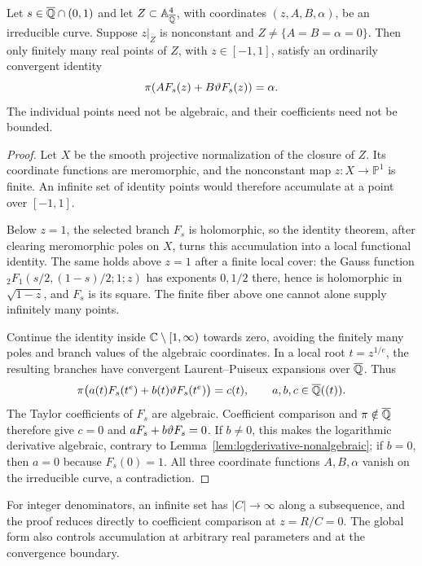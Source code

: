 \begin{theorem}\label{thm:curve-finiteness}
Let $s\in\overline{\mathbb Q}\cap(0,1)$ and let $Z\subset\mathbb A^4_{\overline{\mathbb Q}}$,
with coordinates $(z,A,B,\alpha)$, be an irreducible curve. Suppose
$z|_Z$ is nonconstant and $Z\ne\{A=B=\alpha=0\}$. Then only finitely
many real points of $Z$, with $z\in[-1,1]$, satisfy an ordinarily
convergent identity
\begin{equation}\label{eq:curve-identity}
                  \pi(AF_s(z)+B\vartheta F_s(z))=\alpha.
\end{equation}
The individual points need not be algebraic, and their coefficients
need not be bounded.
\end{theorem}
\begin{proof}
Let $X$ be the smooth projective normalization of the closure of $Z$.
Its coordinate functions are meromorphic, and the nonconstant map
$z:X\to\mathbb P^1$ is finite. An infinite set of identity points
would therefore accumulate at a point over $[-1,1]$.

Below $z=1$, the selected branch $F_s$ is holomorphic, so the identity
theorem, after clearing meromorphic poles on $X$, turns this accumulation
into a local functional identity. The same holds above $z=1$ after a
finite local cover: the Gauss function
${}_2F_1(s/2,(1-s)/2;1;z)$ has exponents $0,1/2$ there, hence is
holomorphic in $\sqrt{1-z}$, and $F_s$ is its square. The finite
fiber above one cannot alone supply infinitely many points.

Continue the identity inside $\mathbb C\setminus[1,\infty)$ towards zero,
avoiding the finitely many poles and branch values of the algebraic
coordinates. In a local root $t=z^{1/e}$, the resulting branches have
convergent Laurent--Puiseux expansions over $\overline{\mathbb Q}$. Thus
\[
 \pi\bigl(a(t)F_s(t^e)+b(t)\vartheta F_s(t^e)\bigr)=c(t),
 \qquad a,b,c\in\overline{\mathbb Q}((t)).
\]
The Taylor coefficients of $F_s$ are algebraic. Coefficient comparison
and $\pi\notin\overline{\mathbb Q}$ therefore give $c=0$ and
$aF_s+b\vartheta F_s=0$. If $b\ne0$, this makes the logarithmic
derivative algebraic, contrary to Lemma~\ref{lem:logderivative-nonalgebraic};
if $b=0$, then $a=0$ because $F_s(0)=1$. All three coordinate functions
$A,B,\alpha$ vanish on the irreducible curve, a contradiction.
\end{proof}

For integer denominators, an infinite set has $|C|\to\infty$ along a
subsequence, and the proof reduces directly to coefficient comparison
at $z=R/C=0$. The global form also controls accumulation at arbitrary
real parameters and at the convergence boundary.

